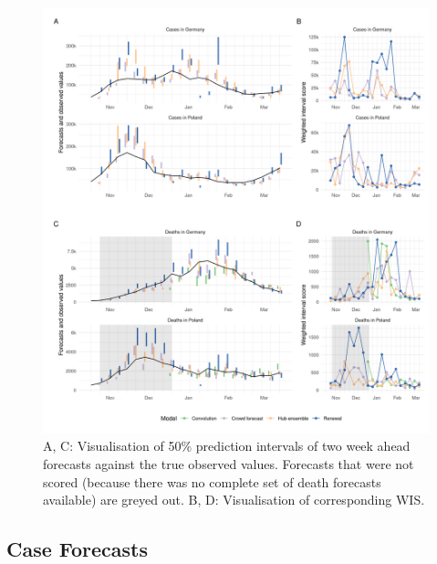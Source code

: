 \documentclass[
]{article}
\begin{document}
\begin{figure}[H]
\includegraphics[width=1\linewidth,]{../analysis/plots/figure-forecasts-2} \caption{A, C: Visualisation of 50\% prediction intervals of two week ahead forecasts against the true observed values. Forecasts that were not scored (because there was no complete set of death forecasts available) are greyed out. B, D: Visualisation of corresponding WIS.}\label{fig:forecasts-and-truth}
\end{figure}

\hypertarget{case-forecasts}{%
\subsection{Case Forecasts}\label{case-forecasts}}
\end{document}
